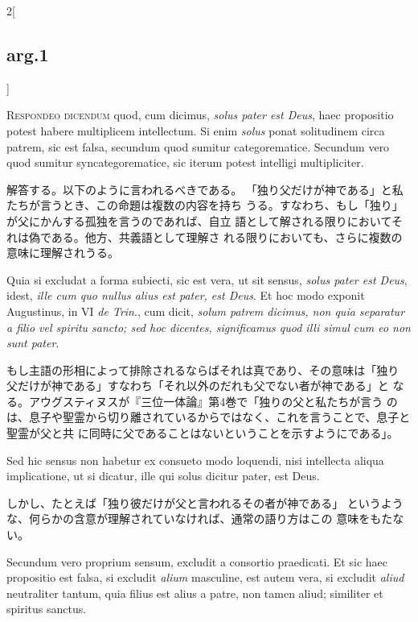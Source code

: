 \documentclass[paper=a4paper,fontsize=10pt,jafontsize=9pt,titlepage]{jlreq}
\begin{document}
\begin{paracol}{2}[\subsection{arg.1}]

{\scshape Respondeo dicendum} quod, cum dicimus, {\itshape solus pater est Deus}, haec
propositio potest habere multiplicem intellectum. Si enim {\itshape solus} ponat
solitudinem circa patrem, sic est falsa, secundum quod sumitur
categorematice. Secundum vero quod sumitur syncategorematice, sic
iterum potest intelligi multipliciter.

\switchcolumn

解答する。以下のように言われるべきである。
「独り父だけが神である」と私たちが言うとき、この命題は複数の内容を持ち
 うる。すなわち、もし「独り」が父にかんする孤独を言うのであれば、自立
 語として解される限りにおいてそれは偽である。他方、共義語として理解さ
 れる限りにおいても、さらに複数の意味に理解されうる。

\switchcolumn*

Quia si excludat a forma
subiecti, sic est vera, ut sit sensus, {\itshape solus pater est Deus}, idest,
{\itshape ille cum quo nullus alius est pater, est Deus}. Et hoc modo exponit
Augustinus, in VI {\itshape de Trin}., cum dicit, {\itshape solum patrem dicimus, non quia
separatur a filio vel spiritu sancto; sed hoc dicentes, significamus
quod illi simul cum eo non sunt pater}.

\switchcolumn

もし主語の形相によって排除されるならばそれは真であり、その意味は「独り
 父だけが神である」すなわち「それ以外のだれも父でない者が神である」と
 なる。アウグスティヌスが『三位一体論』第4巻で「独りの父と私たちが言う
 のは、息子や聖霊から切り離されているからではなく、これを言うことで、息子と聖霊が父と共
 に同時に父であることはないということを示すようにである」。

\switchcolumn*

Sed hic sensus non habetur ex
consueto modo loquendi, nisi intellecta aliqua implicatione, ut si
dicatur, ille qui solus dicitur pater, est Deus.

\switchcolumn

しかし、たとえば「独り彼だけが父と言われるその者が神である」
 というような、何らかの含意が理解されていなければ、通常の語り方はこの
 意味をもたない。

\switchcolumn*

Secundum vero
proprium sensum, excludit a consortio praedicati.
Et sic haec
propositio est falsa, si excludit {\itshape alium} masculine, est autem vera, si
excludit {\itshape aliud} neutraliter tantum, quia filius est alius a patre, non
tamen aliud; similiter et spiritus sanctus.


\end{paracol}
\end{document}
